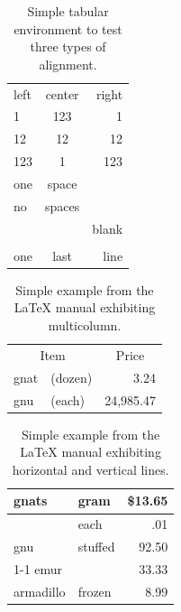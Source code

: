 ﻿\documentclass{article}
\begin{document}
\begin{table}
\begin{center}
\begin{tabular}{lcr}
left & center & right \\
1 & 123 & 1 \\
12 & 12 & 12 \\
123 & 1 & 123 \\
one & space & \\
no & spaces &\\
&& blank\\
&&\\
one & last & line
\end{tabular}
\caption{Simple tabular environment to test three types of alignment.}
\end{center}
\end{table}

\begin{table}
\begin{center}
\begin{tabular}{llr}
\multicolumn{2}{c}{Item} & \multicolumn{1}{c}{Price} \\
gnat      & (dozen)  & 3.24\\
gnu       & (each)   & 24,985.47 
\end{tabular}
\caption{Simple example from the \LaTeX{} manual exhibiting multicolumn.}
\end{center}
\end{table}

\begin{table}
\begin{center}
\begin{tabular}{||l|lr||}
\hline
gnats     & gram    & \$13.65 \\
\hline
          & each    &     .01 \\
\hline
gnu       & stuffed &   92.50 \\
\cline{1-1} \cline{3-3}
emur      &         &   33.33 \\
armadillo & frozen  &    8.99 \\
\hline
\end{tabular}
\caption{Simple example from the \LaTeX{} manual exhibiting horizontal
and vertical lines.}
\end{center}
\end{table}
\end{document}
